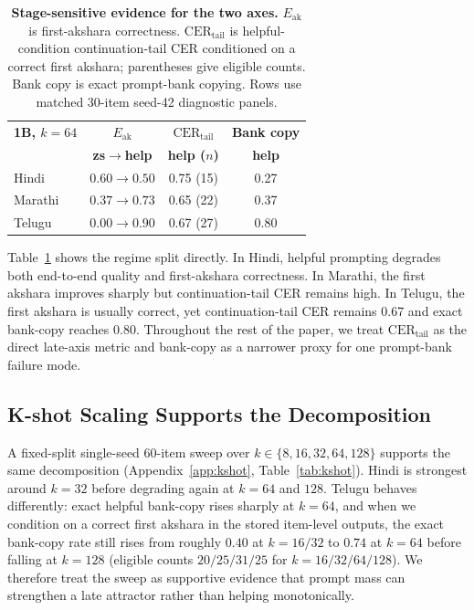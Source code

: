 \documentclass{article}
\begin{document}
\begin{table}[t]
\centering
\small
\setlength{\tabcolsep}{4.5pt}
\begin{tabular}{@{}lccc@{}}
\toprule
\textbf{1B, $k{=}64$} & \textbf{$E_{\mathrm{ak}}$} & \textbf{$\mathrm{CER}_{\mathrm{tail}}$} & \textbf{Bank copy} \\
 & \textbf{zs$\to$help} & \textbf{help ($n$)} & \textbf{help} \\
\midrule
Hindi   & $0.60 \to 0.50$ & 0.75 (15) & 0.27 \\
Marathi & $0.37 \to 0.73$ & 0.65 (22) & 0.37 \\
Telugu  & $0.00 \to 0.90$ & 0.67 (27) & 0.80 \\
\bottomrule
\end{tabular}
\caption{\textbf{Stage-sensitive evidence for the two axes.} $E_{\mathrm{ak}}$ is first-akshara correctness. $\mathrm{CER}_{\mathrm{tail}}$ is helpful-condition continuation-tail CER conditioned on a correct first akshara; parentheses give eligible counts. Bank copy is exact prompt-bank copying. Rows use matched 30-item seed-42 diagnostic panels.}
\label{tab:axes_metrics}
\vspace{4pt}
\end{table}

Table~\ref{tab:axes_metrics} shows the regime split directly. In Hindi, helpful prompting degrades both end-to-end quality and first-akshara correctness. In Marathi, the first akshara improves sharply but continuation-tail CER remains high. In Telugu, the first akshara is usually correct, yet continuation-tail CER remains 0.67 and exact bank-copy reaches 0.80. Throughout the rest of the paper, we treat $\mathrm{CER}_{\mathrm{tail}}$ as the direct late-axis metric and bank-copy as a narrower proxy for one prompt-bank failure mode.

\subsection{K-shot Scaling Supports the Decomposition}\label{sec:kshot}

A fixed-split single-seed 60-item sweep over $k \in \{8,16,32,64,128\}$ supports the same decomposition (Appendix~\ref{app:kshot}, Table~\ref{tab:kshot}). Hindi is strongest around $k{=}32$ before degrading again at $k{=}64$ and $128$. Telugu behaves differently: exact helpful bank-copy rises sharply at $k{=}64$, and when we condition on a correct first akshara in the stored item-level outputs, the exact bank-copy rate still rises from roughly $0.40$ at $k{=}16/32$ to $0.74$ at $k{=}64$ before falling at $k{=}128$ (eligible counts $20/25/31/25$ for $k{=}16/32/64/128$). We therefore treat the sweep as supportive evidence that prompt mass can strengthen a late attractor rather than helping monotonically.
\end{document}
